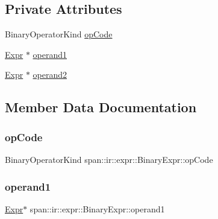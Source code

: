 \subsection*{Private Attributes}
\begin{DoxyCompactItemize}
\item 
Binary\+Operator\+Kind \hyperlink{classspan_1_1ir_1_1expr_1_1BinaryExpr_ab80abc5dcf5f80796c5f720f523f8375}{op\+Code}
\item 
\hyperlink{classspan_1_1ir_1_1expr_1_1Expr}{Expr} $\ast$ \hyperlink{classspan_1_1ir_1_1expr_1_1BinaryExpr_a7aa42a9ab32fe625a6b065601cb5a78f}{operand1}
\item 
\hyperlink{classspan_1_1ir_1_1expr_1_1Expr}{Expr} $\ast$ \hyperlink{classspan_1_1ir_1_1expr_1_1BinaryExpr_a60b088f3fcd2aabbc10445b4c693cfcf}{operand2}
\end{DoxyCompactItemize}


\subsection{Member Data Documentation}
\mbox{\label{classspan_1_1ir_1_1expr_1_1BinaryExpr_ab80abc5dcf5f80796c5f720f523f8375}} 
\subsubsection{\texorpdfstring{op\+Code}{opCode}}
{\footnotesize\ttfamily Binary\+Operator\+Kind span\+::ir\+::expr\+::\+Binary\+Expr\+::op\+Code\hspace{0.3cm}{\ttfamily [private]}}

\mbox{\label{classspan_1_1ir_1_1expr_1_1BinaryExpr_a7aa42a9ab32fe625a6b065601cb5a78f}} 
\subsubsection{\texorpdfstring{operand1}{operand1}}
{\footnotesize\ttfamily \hyperlink{classspan_1_1ir_1_1expr_1_1Expr}{Expr}$\ast$ span\+::ir\+::expr\+::\+Binary\+Expr\+::operand1\hspace{0.3cm}{\ttfamily [private]}}

